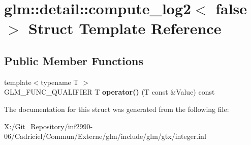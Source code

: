 \hypertarget{structglm_1_1detail_1_1compute__log2_3_01false_01_4}{\section{glm\-:\-:detail\-:\-:compute\-\_\-log2$<$ false $>$ Struct Template Reference}
\label{structglm_1_1detail_1_1compute__log2_3_01false_01_4}
}
\subsection*{Public Member Functions}
\begin{DoxyCompactItemize}
\item 
\hypertarget{structglm_1_1detail_1_1compute__log2_3_01false_01_4_a8aef11c23abbfbc89222dfc5f2ffd260}{{\footnotesize template$<$typename T $>$ }\\G\-L\-M\-\_\-\-F\-U\-N\-C\-\_\-\-Q\-U\-A\-L\-I\-F\-I\-E\-R T {\bfseries operator()} (T const \&Value) const }\label{structglm_1_1detail_1_1compute__log2_3_01false_01_4_a8aef11c23abbfbc89222dfc5f2ffd260}

\end{DoxyCompactItemize}


The documentation for this struct was generated from the following file\-:\begin{DoxyCompactItemize}
\item 
X\-:/\-Git\-\_\-\-Repository/inf2990-\/06/\-Cadriciel/\-Commun/\-Externe/glm/include/glm/gtx/integer.\-inl\end{DoxyCompactItemize}

